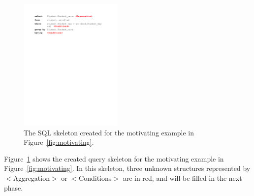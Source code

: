 \vspace{1mm}




\begin{figure}[t]
	\centering
		\includegraphics[width=0.45\textwidth]{sql_skeleton.pdf}
	\caption{The SQL skeleton created for the motivating example
in Figure~\ref{fig:motivating}.}
	\label{fig:skeleton}
\end{figure}

Figure~\ref{fig:skeleton} shows the created query skeleton
for the motivating example in Figure~\ref{fig:motivating}.
In this skeleton,  three unknown structures represented by
$<$Aggregation$>$ or $<$Conditions$>$ are in red, and
will be filled in the next phase. 








